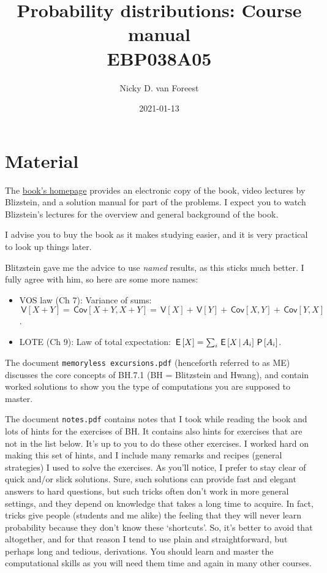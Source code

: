 \documentclass[a4paper]{article}
\author{Nicky D. van Foreest}
\date{2021-01-13}
\title{Probability distributions: Course manual\\\medskip
\large EBP038A05}
\theoremstyle{definition}
\newcommand{\given}{\,\middle|\,}
\renewcommand{\P}[1]{\,\mathsf{P}\left[#1\right]}
\newcommand{\E}[1]{\,\mathsf{E}\/\left[#1\right]}
\newcommand{\V}[1]{\,\mathsf{V}\left[#1\right]}
\newcommand{\cov}[1]{\,\mathsf{Cov}\left[#1\right]}
\newcommand{\1}[1]{\,I_{#1}} %
\begin{document}
\maketitle
\tableofcontents


\section{Material}
\label{sec:org3dba2bd}

The \href{https://projects.iq.harvard.edu/stat110/home}{book's homepage} provides an electronic copy of the book, video lectures by Blizstein, and a solution manual for part of the problems.
I expect you to watch Blizstein's lectures for the overview and general background of the book.

I advise you to buy the book as it makes studying easier, and it is very practical to look up things later.

Blitzstein gave me  the advice to use \emph{named} results, as this sticks much better. I fully agree with him, so here are some more names:
\begin{itemize}
\item VOS law (Ch 7): Variance of sums: \(\V{X+Y}= \cov{X+Y, X+Y} = \V X + \V Y + \cov{X,Y} + \cov{Y, X}\).
\item LOTE  (Ch 9):  Law of total expectation: \(\E{X} = \sum_{i} \E{X \given A_i} \P{A_i}\).
\end{itemize}

The document \texttt{memoryless excursions.pdf} (henceforth referred to as ME) discusses the core concepts of BH.7.1 (BH = Blitzstein and Hwang), and contain worked solutions to show you the type of computations you are supposed to master. 

The document \texttt{notes.pdf} contains notes that I took while reading the book and lots of hints for the exercises of BH.
It contains also hints for exercises that are not in the list below.
It's up to you to do these other exercises.
I worked hard on making this set of hints, and I include many remarks and recipes (general strategies) I used to solve the exercises.
As you'll notice, I prefer to stay clear of quick and/or slick solutions.
Sure, such solutions can provide fast and elegant answers to hard questions, but such tricks often don't work in more general settings, and they depend on knowledge that takes a long time to acquire.
In fact, tricks give people (students and me alike) the feeling that they will never learn probability because they don't know these `shortcuts'.
So, it's better to avoid that altogether, and for that reason I tend to use plain and straightforward, but perhaps long and tedious, derivations.
You should learn and master the computational skills as you will need them time and again in many other courses.
\end{document}
